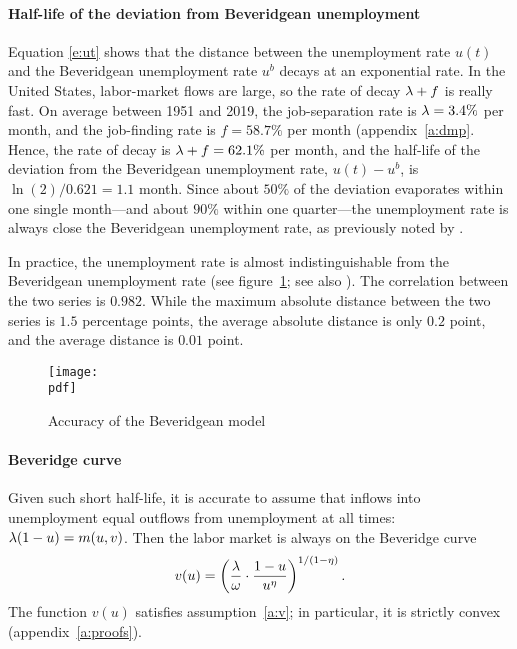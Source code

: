 \documentclass[letterpaper,12pt,leqno]{article}
\def\pdf{../../figures/xhosios_202103.pdf}
\begin{document}
\paragraph{Half-life of the deviation from Beveridgean unemployment} Equation \eqref{e:ut} shows that the distance between the unemployment rate $u(t)$ and the Beveridgean unemployment rate $u^b$ decays at an exponential rate. In the United States, labor-market flows are large, so the rate of decay $\lambda+f$ is really fast. On average between 1951 and 2019, the job-separation rate is $\lambda = 3.4\%$ per month, and the job-finding rate is $f = 58.7 \%$ per month (appendix~\ref{a:dmp}. Hence, the rate of decay is $\lambda+f = 62.1 \%$ per month, and the half-life of the deviation from the Beveridgean unemployment rate, $u(t)-u^b$, is $\ln(2)/0.621 = 1.1$ month. Since about $50\%$ of the deviation evaporates within one single month---and about $90\%$ within one quarter---the unemployment rate is always close the Beveridgean unemployment rate, as previously noted by .

In practice, the unemployment rate is almost indistinguishable from the Beveridgean unemployment rate (see figure~\ref{f:accuracy}; see also ). The correlation between the two series is $0.982$. While the maximum absolute distance between the two series is $1.5$ percentage points, the average absolute distance is only $0.2$ point, and the average distance is $0.01$ point. 

\begin{figure}[t!]
\texttt{[image: \\pdf]}
\caption{Accuracy of the Beveridgean model}
\label{f:accuracy}\end{figure}

\paragraph{Beveridge curve} Given such short half-life, it is accurate to assume that inflows into unemployment equal outflows from unemployment at all times: $\lambda (1-u) = m(u,v)$. Then the labor market is always on the Beveridge curve
\begin{equation}
v(u) = \left( \frac{\lambda}{\omega}\cdot\frac{1-u}{u^{\eta}} \right)^{1/(1-\eta)}.
\label{e:v}\end{equation}
The function $v(u)$ satisfies assumption~\ref{a:v}; in particular, it is strictly convex (appendix~\ref{a:proofs}).
\end{document}
